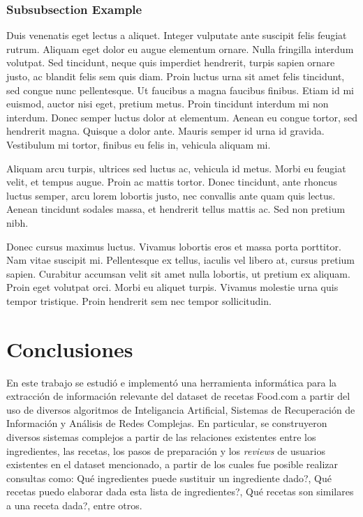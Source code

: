 \documentclass[
	a4paper, %
	10pt, %
	unnumberedsections, %
	twoside, %
]{LTJournalArticle}
\begin{document}
\subsubsection{Subsubsection Example}

Duis venenatis eget lectus a aliquet. Integer vulputate ante suscipit felis feugiat rutrum. Aliquam eget dolor eu augue elementum ornare. Nulla fringilla interdum volutpat. Sed tincidunt, neque quis imperdiet hendrerit, turpis sapien ornare justo, ac blandit felis sem quis diam. Proin luctus urna sit amet felis tincidunt, sed congue nunc pellentesque. Ut faucibus a magna faucibus finibus. Etiam id mi euismod, auctor nisi eget, pretium metus. Proin tincidunt interdum mi non interdum. Donec semper luctus dolor at elementum. Aenean eu congue tortor, sed hendrerit magna. Quisque a dolor ante. Mauris semper id urna id gravida. Vestibulum mi tortor, finibus eu felis in, vehicula aliquam mi.

Aliquam arcu turpis, ultrices sed luctus ac, vehicula id metus. Morbi eu feugiat velit, et tempus augue. Proin ac mattis tortor. Donec tincidunt, ante rhoncus luctus semper, arcu lorem lobortis justo, nec convallis ante quam quis lectus. Aenean tincidunt sodales massa, et hendrerit tellus mattis ac. Sed non pretium nibh. 

Donec cursus maximus luctus. Vivamus lobortis eros et massa porta porttitor. Nam vitae suscipit mi. Pellentesque ex tellus, iaculis vel libero at, cursus pretium sapien. Curabitur accumsan velit sit amet nulla lobortis, ut pretium ex aliquam. Proin eget volutpat orci. Morbi eu aliquet turpis. Vivamus molestie urna quis tempor tristique. Proin hendrerit sem nec tempor sollicitudin.


\printbibliography %


\section{Conclusiones}

En este trabajo se estudió e implementó una herramienta informática para la extracción de información relevante del dataset de recetas Food.com a partir del uso de diversos algoritmos de Inteligancia Artificial, Sistemas de Recuperación de Información y Análisis de Redes Complejas. En particular, se construyeron diversos sistemas complejos a partir de las relaciones existentes entre los ingredientes, las recetas, los pasos de preparación y los \textit{reviews} de usuarios existentes en el dataset mencionado, a partir de los cuales fue posible realizar consultas como: Qué ingredientes puede sustituir un ingrediente dado?, Qué recetas puedo elaborar dada esta lista de ingredientes?, Qué recetas son similares a una receta dada?, entre otros. 
\end{document}
